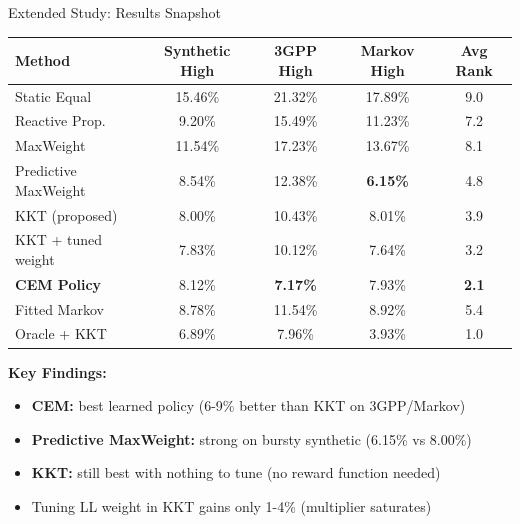 \documentclass[aspectratio=169]{beamer}
\begin{document}
\begin{frame}{Extended Study: Results Snapshot}
\begin{table}
\tiny
\begin{tabular}{lcccc}
\toprule
\textbf{Method} & \textbf{Synthetic High} & \textbf{3GPP High} & \textbf{Markov High} & \textbf{Avg Rank} \\
\midrule
Static Equal & 15.46\% & 21.32\% & 17.89\% & 9.0 \\
Reactive Prop. & 9.20\% & 15.49\% & 11.23\% & 7.2 \\
MaxWeight & 11.54\% & 17.23\% & 13.67\% & 8.1 \\
Predictive MaxWeight & 8.54\% & 12.38\% & \textbf{6.15\%} & 4.8 \\
KKT (proposed) & 8.00\% & 10.43\% & 8.01\% & 3.9 \\
KKT + tuned weight & 7.83\% & 10.12\% & 7.64\% & 3.2 \\
\textbf{CEM Policy} & 8.12\% & \textbf{7.17\%} & 7.93\% & \textbf{2.1} \\
Fitted Markov & 8.78\% & 11.54\% & 8.92\% & 5.4 \\
Oracle + KKT & 6.89\% & 7.96\% & 3.93\% & 1.0 \\
\bottomrule
\end{tabular}
\end{table}

\textbf{Key Findings:}
\begin{itemize}
    \item \textbf{CEM:} best learned policy (6-9\% better than KKT on 3GPP/Markov)
    \item \textbf{Predictive MaxWeight:} strong on bursty synthetic (6.15\% vs 8.00\%)
    \item \textbf{KKT:} still best with nothing to tune (no reward function needed)
    \item Tuning LL weight in KKT gains only 1-4\% (multiplier saturates)
\end{itemize}
\end{frame}
\end{document}
